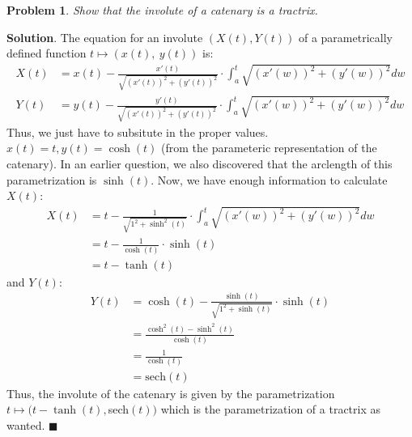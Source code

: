 \documentclass[12pt]{article}
\renewcommand{\=}[1]{\stackrel{#1}{=}} %
\newtheorem{p}{Problem}[section]
\theoremstyle{definition}
\newenvironment{s}{%
        \begin{trivlist} \item \textbf{Solution}. }{%
            \hspace*{\fill} $\blacksquare$\end{trivlist}}%
\begin{document}
\begin{p}
    Show that the involute of a catenary is a tractrix.
\end{p}
\begin{s}
    The equation for an involute $(X(t), Y(t))$ of a parametrically defined function $t\mapsto (x(t),\:y(t))$ is:
    \begin{align*}
        X(t) &= x(t) - \frac{x'(t)}{\sqrt{(x'(t))^2+(y'(t))^2}}\cdot\int_{a}^{t}\sqrt{(x'(w))^2+(y'(w))^2}dw \\
        Y(t) &= y(t) - \frac{y'(t)}{\sqrt{(x'(t))^2+(y'(t))^2}}\cdot\int_a^t\sqrt{(x'(w))^2+(y'(w))^2}dw
    \end{align*}
    Thus, we just have to subsitute in the proper values. $x(t) = t, y(t) = \cosh(t)$ (from the parameteric 
    representation of the catenary). In an earlier question, we also discovered that the arclength of this
    parametrization is $\sinh(t)$. Now, we have enough information to calculate $X(t)$:
    \begin{align*}
        X(t) &= t - \frac{1}{\sqrt{1^2+\sinh^2(t)}}\cdot\int_a^t\sqrt{(x'(w))^2+(y'(w))^2}dw \\
        &= t - \frac{1}{\cosh(t)}\cdot\sinh(t) \\
        &= t - \tanh(t)
    \end{align*}
    and $Y(t)$:
    \begin{align*}
        Y(t) &= \cosh(t) - \frac{\sinh(t)}{\sqrt{1^2+\sinh(t)}}\cdot\sinh(t) \\
        &= \frac{\cosh^2(t) - \sinh^2(t)}{\cosh(t)} \\
        &= \frac{1}{\cosh(t)} \\
        &= \text{sech}(t)
    \end{align*}
    Thus, the involute of the catenary is given by the parametrization $t\mapsto(t-\tanh(t),$sech$(t))$ which is
    the parametrization of a tractrix as wanted.
\end{s}
\end{document}
